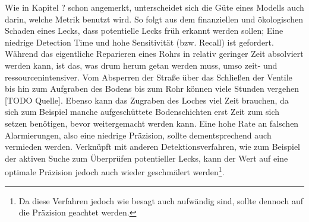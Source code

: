 Wie in Kapitel ? schon angemerkt, unterscheidet sich die Güte eines Modells auch darin, welche Metrik
 benutzt wird. So folgt aus dem finanziellen und ökologischen Schaden eines Lecks, dass potentielle Lecks
 früh erkannt werden sollen; Eine niedrige Detection Time und hohe Sensitivität (bzw. Recall) ist gefordert.
 Während das eigentliche Reparieren eines Rohrs in relativ geringer Zeit absolviert werden kann, ist das, was
 drum herum getan werden muss, umso zeit- und ressourcenintensiver. Vom Absperren der Straße über das Schließen
 der Ventile bis hin zum Aufgraben des Bodens bis zum Rohr können viele Stunden vergehen [TODO Quelle]. Ebenso kann
 das Zugraben des Loches viel Zeit brauchen, da sich zum Beispiel manche aufgeschüttete Bodenschichten erst Zeit
 zum sich setzen benötigen, bevor weitergemacht werden kann. Eine hohe Rate an falschen Alarmierungen, also eine
 niedrige Präzision, sollte dementsprechend auch vermieden werden. Verknüpft mit anderen Detektionsverfahren,
 wie zum Beispiel der aktiven Suche zum Überprüfen potentieller Lecks, kann der Wert auf eine optimale Präzision
 jedoch auch wieder geschmälert werden\footnote{Da diese Verfahren jedoch wie besagt auch aufwändig sind, sollte
 dennoch auf die Präzision geachtet werden.}.

